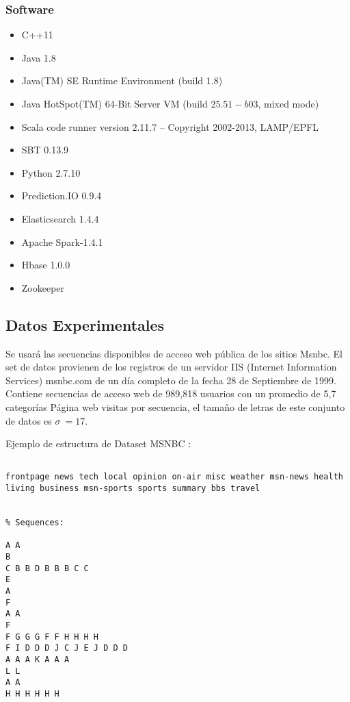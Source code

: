 \subsubsection{Software}

\begin{itemize}
	\item C++11
	\item Java  1.8
	\item Java(TM) SE Runtime Environment (build 1.8)
	\item Java HotSpot(TM) 64-Bit Server VM (build $25.51-b03$, mixed mode)
	\item Scala code runner version 2.11.7 -- Copyright 2002-2013, LAMP/EPFL
	\item SBT 0.13.9 
	\item Python 2.7.10
	\item Prediction.IO 0.9.4
	\item Elasticsearch 1.4.4	
	\item Apache Spark-1.4.1
	\item Hbase 1.0.0
	\item Zookeeper 

\end{itemize}


\subsection{Datos Experimentales}

Se usará las secuencias disponibles de acceso web pública de los sitios Msnbc. El set de datos provienen de los registros de un servidor IIS (Internet Information Services) msnbc.com de un día completo de la fecha  28 de Septiembre de 1999. 
Contiene secuencias de acceso web de 989,818 usuarios con un promedio de 5,7  categorías Página web visitas por secuencia, el tamaño de letras de este conjunto de datos es $\sigma \ = 17$.


Ejemplo de estructura de Dataset MSNBC :
\vspace{1cm}

\begin{lstlisting}[frame=single,basicstyle=\ttfamily\tiny,]
% Different categories found in input file:

frontpage news tech local opinion on-air misc weather msn-news health living business msn-sports sports summary bbs travel


% Sequences:

A A 
B 
C B B D B B B C C 
E 
A 
F 
A A 
F 
F G G G F F H H H H 
F I D D D J C J E J D D D 
A A A K A A A 
L L 
A A 
H H H H H H 
\end{lstlisting}





